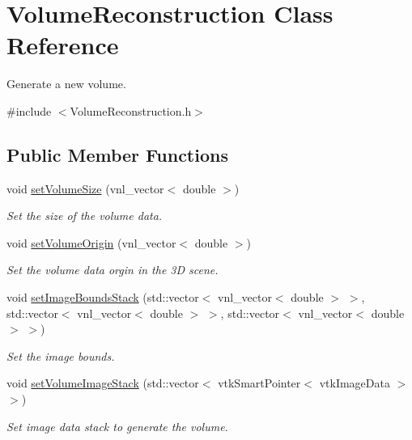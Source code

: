 \hypertarget{class_volume_reconstruction}{\section{Volume\-Reconstruction Class Reference}
\label{d0/d82/class_volume_reconstruction}
}


Generate a new volume.  




{\ttfamily \#include $<$Volume\-Reconstruction.\-h$>$}

\subsection*{Public Member Functions}
\begin{DoxyCompactItemize}
\item 
void \hyperlink{class_volume_reconstruction_a91d4ebf982057964f9a27e293833bde0}{set\-Volume\-Size} (vnl\-\_\-vector$<$ double $>$)
\begin{DoxyCompactList}\small\item\em Set the size of the volume data. \end{DoxyCompactList}\item 
void \hyperlink{class_volume_reconstruction_a5bbf3c65905834931937a0e973e571d9}{set\-Volume\-Origin} (vnl\-\_\-vector$<$ double $>$)
\begin{DoxyCompactList}\small\item\em Set the volume data orgin in the 3\-D scene. \end{DoxyCompactList}\item 
void \hyperlink{class_volume_reconstruction_a4ad4c87bba6fc1f23cebc591f6f446f1}{set\-Image\-Bounds\-Stack} (std\-::vector$<$ vnl\-\_\-vector$<$ double $>$ $>$, std\-::vector$<$ vnl\-\_\-vector$<$ double $>$ $>$, std\-::vector$<$ vnl\-\_\-vector$<$ double $>$ $>$)
\begin{DoxyCompactList}\small\item\em Set the image bounds. \end{DoxyCompactList}\item 
void \hyperlink{class_volume_reconstruction_a48ad149cd89751de3288f9eab48301dc}{set\-Volume\-Image\-Stack} (std\-::vector$<$ vtk\-Smart\-Pointer$<$ vtk\-Image\-Data $>$ $>$)
\begin{DoxyCompactList}\small\item\em Set image data stack to generate the volume. \end{DoxyCompactList}\item 

\end{DoxyCompactItemize}
